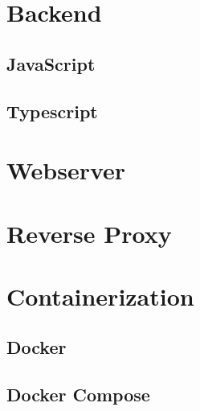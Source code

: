 

\section{Backend}

\subsection{JavaScript}

\subsection{Typescript}


\section{Webserver}


\section{Reverse Proxy}


\section{Containerization}

\subsection{Docker}

\subsection{Docker Compose}